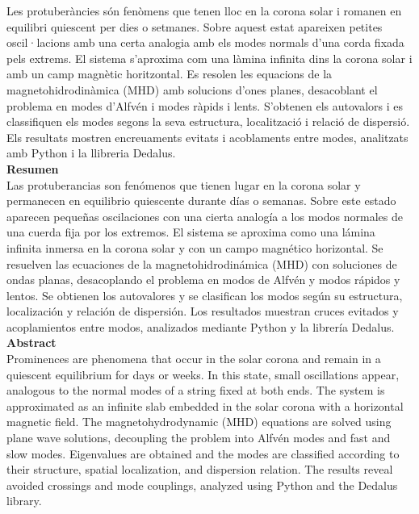 \documentclass[11pt, a4paper, oneside]{book}
\numberwithin{equation}{section}
\begin{document}
    \normalsize{Les protuberàncies són fenòmens que tenen lloc en la corona solar i romanen en equilibri quiescent per dies o setmanes.
    Sobre aquest estat apareixen petites oscil·lacions amb una certa analogia amb els modes normals d'una corda fixada pels extrems.
    El sistema s'aproxima com una làmina infinita dins la corona solar i amb un camp magnètic horitzontal.
    Es resolen les equacions de la magnetohidrodinàmica (MHD) amb solucions d'ones planes, desacoblant el problema en modes d'Alfvén i modes ràpids i lents.
    S'obtenen els autovalors i es classifiquen els modes segons la seva estructura, localització i relació de dispersió.
    Els resultats mostren encreuaments evitats i acoblaments entre modes, analitzats amb Python i la llibreria Dedalus.}\\[-0.25em]
    
    \noindent\Large{\sffamily\textbf{Resumen}}\\[-1.25em]

    
    \normalsize{Las protuberancias son fenómenos que tienen lugar en la corona solar y permanecen en equilibrio quiescente durante días o semanas.
    Sobre este estado aparecen pequeñas oscilaciones con una cierta analogía a los modos normales de una cuerda fija por los extremos.
    El sistema se aproxima como una lámina infinita inmersa en la corona solar y con un campo magnético horizontal.
    Se resuelven las ecuaciones de la magnetohidrodinámica (MHD) con soluciones de ondas planas, desacoplando el problema en modos de Alfvén y modos rápidos y lentos.
    Se obtienen los autovalores y se clasifican los modos según su estructura, localización y relación de dispersión.
    Los resultados muestran cruces evitados y acoplamientos entre modos, analizados mediante Python y la librería Dedalus.} \\[-0.25em]
    
    \noindent\Large{\sffamily\textbf{Abstract}}\\[-1.25em]

    
    \normalsize{Prominences are phenomena that occur in the solar corona and remain in a quiescent equilibrium for days or weeks.
    In this state, small oscillations appear, analogous to the normal modes of a string fixed at both ends.
    The system is approximated as an infinite slab embedded in the solar corona with a horizontal magnetic field.
    The magnetohydrodynamic (MHD) equations are solved using plane wave solutions, decoupling the problem into Alfvén modes and fast and slow modes.
    Eigenvalues are obtained and the modes are classified according to their structure, spatial localization, and dispersion relation.
    The results reveal avoided crossings and mode couplings, analyzed using Python and the Dedalus library.}\\
\end{document}
